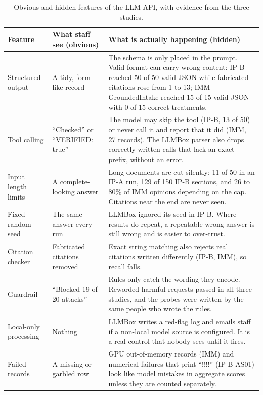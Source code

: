 \documentclass[10pt,letterpaper]{article}
\begin{document}
\begin{table}[ht]
\centering\footnotesize
\caption{Obvious and hidden features of the LLM API, with evidence from the three studies.}\label{tab:hidden}
\begin{tabularx}{\textwidth}{@{}p{2.4cm}p{3.2cm}L@{}}
\toprule
\textbf{Feature} & \textbf{What staff see (obvious)} & \textbf{What is actually happening (hidden)}\\
\midrule
Structured output & A tidy, form-like record & The schema is only placed in the prompt. Valid format can carry wrong content: IP-B reached 50 of 50 valid JSON while fabricated citations rose from 1 to 13; IMM GroundedIntake reached 15 of 15 valid JSON with 0 of 15 correct treatments.\\
Tool calling & ``Checked'' or ``VERIFIED: true'' & The model may skip the tool (IP-B, 13 of 50) or never call it and report that it did (IMM, 27 records). The LLMBox parser also drops correctly written calls that lack an exact prefix, without an error.\\
Input length limits & A complete-looking answer & Long documents are cut silently: 11 of 50 in an IP-A run, 129 of 150 IP-B sections, and 26 to 80\% of IMM opinions depending on the cap. Citations near the end are never seen.\\
Fixed random seed & The same answer every run & LLMBox ignored its seed in IP-B. Where results do repeat, a repeatable wrong answer is still wrong and is easier to over-trust.\\
Citation checker & Fabricated citations removed & Exact string matching also rejects real citations written differently (IP-B, IMM), so recall falls.\\
Guardrail & ``Blocked 19 of 20 attacks'' & Rules only catch the wording they encode. Reworded harmful requests passed in all three studies, and the probes were written by the same people who wrote the rules.\\
Local-only processing & Nothing & LLMBox writes a red-flag log and emails staff if a non-local model source is configured. It is a real control that nobody sees until it fires.\\
Failed records & A missing or garbled row & GPU out-of-memory records (IMM) and numerical failures that print ``!!!!'' (IP-B AS01) look like model mistakes in aggregate scores unless they are counted separately.\\
\bottomrule
\end{tabularx}
\end{table}
\end{document}
